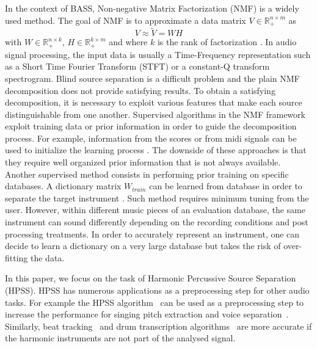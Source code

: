 \documentclass{article}
\begin{document}
In the context of BASS, Non-negative Matrix Factorization (NMF) is a widely used method. The goal of NMF is to approximate a data matrix $V \in \mathbb{R}_{+}^{n \times m} $ as 
\begin{equation}\label{modelNMF}
V \approx \tilde{V} = WH
\end{equation}
with $W \in \mathbb{R}_{+}^{n \times k}$, $H \in \mathbb{R}_{+}^{k \times m}$ and where $k$ is the rank of factorization \cite{lee99}. In audio signal processing, the input data is usually a Time-Frequency representation such as a Short Time Fourier Transform (STFT) or a constant-Q transform spectrogram. Blind source separation is a difficult problem and the plain NMF decomposition does not provide satisfying results. To obtain a satisfying decomposition, it is necessary to exploit various features that make each source distinguishable from one another. 
Supervised algorithms in the NMF framework exploit training data or prior information in order to guide the decomposition process. For example, information from the scores or from midi signals can be used to initialize the learning process \cite{EwertM12}. The downside of these approaches is that they require well organized prior information that is not always available. Another supervised method consists in performing prior training on specific databases. A dictionary matrix $W_{train}$ can be learned from database in order to separate the target instrument \cite{jaureguiberry2011adaptation,wudrum}. Such method requires minimum tuning from the user.  However, within different music pieces of an evaluation database, the same instrument can sound differently depending on the recording conditions and post processing treatments. In order to accurately represent an instrument, one can decide to learn a dictionary on a very large database but takes the risk of over-fitting the data.%


In this paper, we focus on the task of Harmonic Percussive Source Separation (HPSS). HPSS has numerous applications as a preprocessing step for other audio tasks. For example the HPSS algorithm~\cite{fitzgerald2010harmonic} can be used as a preprocessing step to increase the performance for singing pitch extraction and voice separation~\cite{hsu2012tandem}. 
Similarly, beat tracking~\cite{ellis2007beat} and drum transcription algorithms~\cite{paulus2005drum} are more accurate if the harmonic instruments are not part of the analysed signal. 
\end{document}
